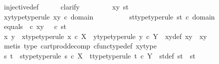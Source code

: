 \begin{isabellebody}
\ injective{\isacharunderscore}{\kern0pt}def\isanewline
\ \ \ \ \ \isamarkupfalse%
{\isacharparenleft}{\kern0pt}clarify{\isacharparenright}{\kern0pt}\isanewline
\ \ \ \ \ \ \ \isamarkupfalse%
\ xy\ st\isanewline
\ \ \ \ \ \ \ \isamarkupfalse%
\ xy{\isacharunderscore}{\kern0pt}type{\isacharbrackleft}{\kern0pt}type{\isacharunderscore}{\kern0pt}rule{\isacharbrackright}{\kern0pt}{\isacharcolon}{\kern0pt}\ {\isachardoublequoteopen}xy\ {\isasymin}\isactrlsub c\ domain\ {\isasymTheta}{\isachardoublequoteclose}\isanewline
\ \ \ \ \ \ \ \isamarkupfalse%
\ st{\isacharunderscore}{\kern0pt}type{\isacharbrackleft}{\kern0pt}type{\isacharunderscore}{\kern0pt}rule{\isacharbrackright}{\kern0pt}{\isacharcolon}{\kern0pt}\ {\isachardoublequoteopen}st\ {\isasymin}\isactrlsub c\ domain\ {\isasymTheta}{\isachardoublequoteclose}\isanewline
\ \ \ \ \ \ \ \isamarkupfalse%
\ equals{\isacharcolon}{\kern0pt}\ {\isachardoublequoteopen}{\isasymTheta}\ {\isasymcirc}\isactrlsub c\ xy\ {\isacharequal}{\kern0pt}\ {\isasymTheta}\ {\isasymcirc}\isactrlsub c\ st{\isachardoublequoteclose}\isanewline
\ \ \ \ \ \ \ \isamarkupfalse%
\ x\ y\ \ x{\isacharunderscore}{\kern0pt}type{\isacharbrackleft}{\kern0pt}type{\isacharunderscore}{\kern0pt}rule{\isacharbrackright}{\kern0pt}{\isacharcolon}{\kern0pt}\ {\isachardoublequoteopen}x\ {\isasymin}\isactrlsub c\ X{\isachardoublequoteclose}\ \ y{\isacharunderscore}{\kern0pt}type{\isacharbrackleft}{\kern0pt}type{\isacharunderscore}{\kern0pt}rule{\isacharbrackright}{\kern0pt}{\isacharcolon}{\kern0pt}\ {\isachardoublequoteopen}y\ {\isasymin}\isactrlsub c\ Y{\isachardoublequoteclose}\ \ xy{\isacharunderscore}{\kern0pt}def{\isacharcolon}{\kern0pt}\ {\isachardoublequoteopen}xy\ {\isacharequal}{\kern0pt}\ {\isasymlangle}x{\isacharcomma}{\kern0pt}y{\isasymrangle}{\isachardoublequoteclose}\isanewline
\ \ \ \ \ \ \ \ \ \isamarkupfalse%
\ {\isacharparenleft}{\kern0pt}metis\ {\isasymTheta}{\isacharunderscore}{\kern0pt}type\ cart{\isacharunderscore}{\kern0pt}prod{\isacharunderscore}{\kern0pt}decomp\ cfunc{\isacharunderscore}{\kern0pt}type{\isacharunderscore}{\kern0pt}def\ xy{\isacharunderscore}{\kern0pt}type{\isacharparenright}{\kern0pt}\isanewline
\ \ \ \ \ \ \ \isamarkupfalse%
\ s\ t\ \ s{\isacharunderscore}{\kern0pt}type{\isacharbrackleft}{\kern0pt}type{\isacharunderscore}{\kern0pt}rule{\isacharbrackright}{\kern0pt}{\isacharcolon}{\kern0pt}\ {\isachardoublequoteopen}s\ {\isasymin}\isactrlsub c\ X{\isachardoublequoteclose}\ \ t{\isacharunderscore}{\kern0pt}type{\isacharbrackleft}{\kern0pt}type{\isacharunderscore}{\kern0pt}rule{\isacharbrackright}{\kern0pt}{\isacharcolon}{\kern0pt}\ {\isachardoublequoteopen}t\ {\isasymin}\isactrlsub c\ Y{\isachardoublequoteclose}\ \ st{\isacharunderscore}{\kern0pt}def{\isacharcolon}{\kern0pt}\ {\isachardoublequoteopen}st\ {\isacharequal}{\kern0pt}\ {\isasymlangle}s{\isacharcomma}{\kern0pt}t{\isasymrangle}{\isachardoublequoteclose}\isanewline

\end{isabellebody}
